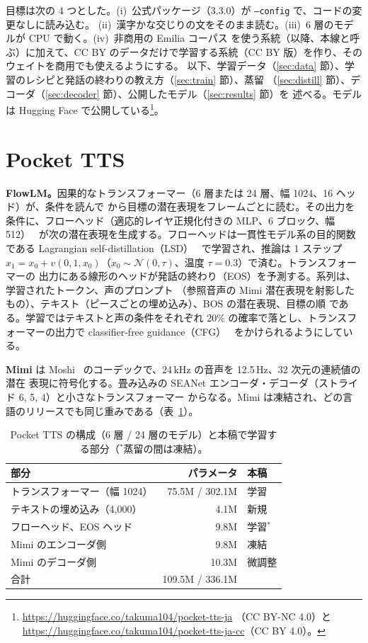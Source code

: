 \documentclass[10pt,a4paper,twocolumn]{article}
\begin{document}
目標は次の 4 つとした。(i)~公式パッケージ（3.3.0）が \texttt{--config} で、コードの変更なしに読み込む。
(ii)~漢字かな交じりの文をそのまま読む。(iii)~6 層のモデルが CPU で動く。(iv)~非商用の Emilia コーパス
を使う系統（以降、本線と呼ぶ）に加えて、CC BY のデータだけで学習する系統（CC BY 版）を作り、そのウェイトを商用でも使えるようにする。
以下、学習データ（\ref{sec:data} 節）、学習のレシピと発話の終わりの教え方（\ref{sec:train} 節）、蒸留
（\ref{sec:distill} 節）、デコーダ（\ref{sec:decoder} 節）、公開したモデル（\ref{sec:results} 節）を
述べる。モデルは Hugging Face で公開している\footnote{\url{https://huggingface.co/takuma104/pocket-tts-ja}
（CC BY-NC 4.0）と \url{https://huggingface.co/takuma104/pocket-tts-ja-cc}（CC BY 4.0）。}。

\section{Pocket TTS}\label{sec:arch}
\textbf{FlowLM。}因果的なトランスフォーマー（6 層または 24 層、幅 1024、16 ヘッド）が、条件を読んで
から目標の潜在表現をフレームごとに読む。その出力を条件に、フローヘッド（適応的レイヤ正規化付きの
MLP、6 ブロック、幅 512）~\cite{mar} が次の潜在表現を生成する。フローヘッドは一貫性モデル系の目的関数
である Lagrangian self-distillation（LSD）~\cite{lsd} で学習され、推論は 1 ステップ
$x_1=x_0+v(0,1,x_0)$（$x_0\sim\mathcal{N}(0,\tau)$、温度 $\tau=0.3$）で済む。トランスフォーマーの
出力にある線形のヘッドが発話の終わり（EOS）を予測する。系列は、学習されたトークン、声のプロンプト
（参照音声の Mimi 潜在表現を射影したもの）、テキスト（ピースごとの埋め込み）、BOS の潜在表現、目標の順
である。学習ではテキストと声の条件をそれぞれ 20\% の確率で落とし、トランスフォーマーの出力で
classifier-free guidance（CFG）~\cite{cfg} をかけられるようにしている。

\textbf{Mimi} は Moshi~\cite{moshi} のコーデックで、24\,kHz の音声を 12.5\,Hz、32 次元の連続値の潜在
表現に符号化する。畳み込みの SEANet エンコーダ・デコーダ（ストライド 6, 5, 4）と小さなトランスフォーマー
からなる。Mimi は凍結され、どの言語のリリースでも同じ重みである（表~\ref{tab:arch}）。

\begin{table}[t]
\centering\footnotesize\setlength{\tabcolsep}{3pt}
\caption{Pocket TTS の構成（6 層 / 24 層のモデル）と本稿で学習する部分（$^\ast$蒸留の間は凍結）。}
\label{tab:arch}
\begin{tabular}{@{}lrl@{}}
\toprule
部分 & パラメータ & 本稿\\
\midrule
トランスフォーマー（幅 1024） & 75.5M / 302.1M & 学習\\
テキストの埋め込み（4,000） & 4.1M & 新規\\
フローヘッド、EOS ヘッド & 9.8M & 学習$^\ast$\\
Mimi のエンコーダ側 & 9.8M & 凍結\\
Mimi のデコーダ側 & 10.3M & 微調整\\
\midrule
合計 & 109.5M / 336.1M &\\
\bottomrule
\end{tabular}
\end{table}
\end{document}
